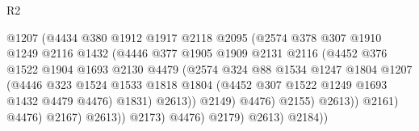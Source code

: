 \begin{lexlean}{R2}
\begin{coremodule}
                                    @1207
                                    (@4434
                                      @380
                                      @1912
                                      @1917
                                      @2118
                                      @2095
                                      (@2574
                                        @378
                                        @307
                                        @1910
                                        @1249
                                        @2116
                                        @1432
                                        (@4446
                                          @377
                                          @1905
                                          @1909
                                          @2131
                                          @2116
                                          (@4452
                                            @376
                                            @1522
                                            @1904
                                            @1693
                                            @2130
                                            @4479
                                            (@2574
                                              @324
                                              @88
                                              @1534
                                              @1247
                                              @1804
                                              @1207
                                              (@4446
                                                @323
                                                @1524
                                                @1533
                                                @1818
                                                @1804
                                                (@4452 @307 @1522 @1249 @1693 @1432 @4479 @4476)
                                                @1831)
                                              @2613))
                                          @2149)
                                        @4476)
                                      @2155)
                                    @2613))
                                @2161)
                              @4476)
                            @2167)
                          @2613))
                      @2173)
                    @4476)
                  @2179)
                @2613)
              @2184))

\end{coremodule}
\end{lexlean}
